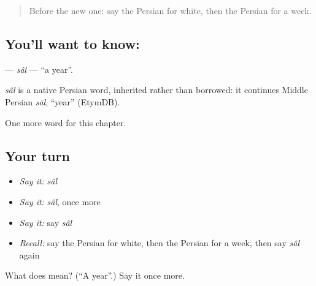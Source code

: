 \begin{quote}
Before the new one: say the Persian for white, then the Persian for a week.
\end{quote}

\subsection*{You'll want to know: }
\textbf{} — \emph{sâl} — \textquotedblleft{}a year\textquotedblright{}.

\begin{cousinweb}
\emph{sâl} is a native Persian word, inherited rather than borrowed: it continues Middle Persian \emph{sāl}, \textquotedblleft{}year\textquotedblright{} (EtymDB).
\end{cousinweb}

\begin{grammarlens}[title={What you've built}]
One more word for this chapter.
\end{grammarlens}

\subsection*{Your turn}
\begin{itemize}
\raggedright
  \item \emph{Say it:} \emph{sâl}
  \item \emph{Say it:} \emph{sâl}, once more
  \item \emph{Say it:} say \emph{sâl}
  \item \emph{Recall:} say the Persian for white, then the Persian for a week, then say \emph{sâl} again
\end{itemize}

\begin{tcolorbox}[breakable,colback=teal!4,colframe=teal!35!black,title={Before you move on}]
What does  mean? (\textquotedblleft{}A year\textquotedblright{}.) Say it once more.
\end{tcolorbox}
